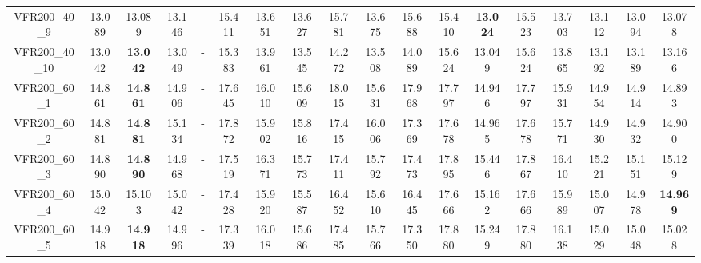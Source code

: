 \begin{tabular}{cc|ccc|ccccccccccccc}
VFR200\_40\_9      & 13.089           & 13.089           & 13.146           & -                & 15.411           & 13.651           & 13.627           & 15.781           & 13.675           & 15.688           & 15.410           & {\bf 13.024}     & 15.523           & 13.703           & 13.112           & 13.094           & 13.078          \\ 
VFR200\_40\_10     & 13.042           & {\bf 13.042}     & 13.049           & -                & 15.383           & 13.961           & 13.545           & 14.272           & 13.508           & 14.089           & 15.624           & 13.049           & 15.624           & 13.865           & 13.192           & 13.189           & 13.166          \\ 
VFR200\_60\_1      & 14.861           & {\bf 14.861}     & 14.906           & -                & 17.645           & 16.010           & 15.609           & 18.015           & 15.631           & 17.968           & 17.797           & 14.946           & 17.797           & 15.931           & 14.954           & 14.914           & 14.893          \\ 
VFR200\_60\_2      & 14.881           & {\bf 14.881}     & 15.134           & -                & 17.872           & 15.902           & 15.816           & 17.415           & 16.006           & 17.369           & 17.678           & 14.965           & 17.678           & 15.771           & 14.930           & 14.932           & 14.900          \\ 
VFR200\_60\_3      & 14.890           & {\bf 14.890}     & 14.968           & -                & 17.519           & 16.371           & 15.773           & 17.411           & 15.792           & 17.473           & 17.895           & 15.446           & 17.867           & 16.410           & 15.221           & 15.151           & 15.129          \\ 
VFR200\_60\_4      & 15.042           & 15.103           & 15.042           & -                & 17.428           & 15.920           & 15.587           & 16.452           & 15.610           & 16.445           & 17.666           & 15.162           & 17.666           & 15.989           & 15.007           & 14.978           & {\bf 14.969}    \\ 
VFR200\_60\_5      & 14.918           & {\bf 14.918}     & 14.996           & -                & 17.339           & 16.018           & 15.686           & 17.485           & 15.766           & 17.350           & 17.880           & 15.249           & 17.880           & 16.138           & 15.029           & 15.048           & 15.028          \\ 

\end{tabular}
